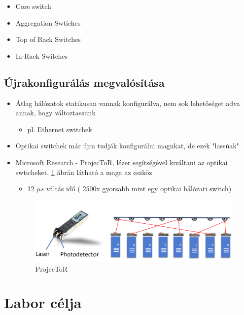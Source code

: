 \documentclass[12pt]{report}
\begin{document}
\begin{itemize}
	\item Core switch
	\item Aggregation Swtiches
	\item Top of Rack Switches
	\item In-Rack Switches
\end{itemize}

\subsection{Újrakonfigurálás megvalósítása}

\begin{itemize}
	\item Átlag hálózatok statikusan vannak konfigurálva, nem  sok lehetőséget adva annak, hogy változtassunk 
	\begin{itemize}
		\item pl. Ethernet switchek
	\end{itemize}
	\item Optikai switchek már újra tudják konfigurálni magukat, de ezek "lassúak"
	\item Microsoft Research - ProjecToR\cite{ghobadi_projector:_2016}, lézer segítségével kiváltani az optikai swticheket, \ref{projector-fig} ábrán látható a maga az eszköz
	\begin{itemize}
		\item 12 $\mu s$ váltás idő ( 2500x gyorsabb mint egy optikai hálózati switch)
	\end{itemize}
	
	\begin{figure}[h]
		\centering
		\includegraphics[width=0.9\linewidth]{pictures/laserswitch.png}
		\caption{ProjecToR}\label{projector-fig}
	\end{figure}
	
	
\end{itemize}

\section{Labor célja}
\end{document}
